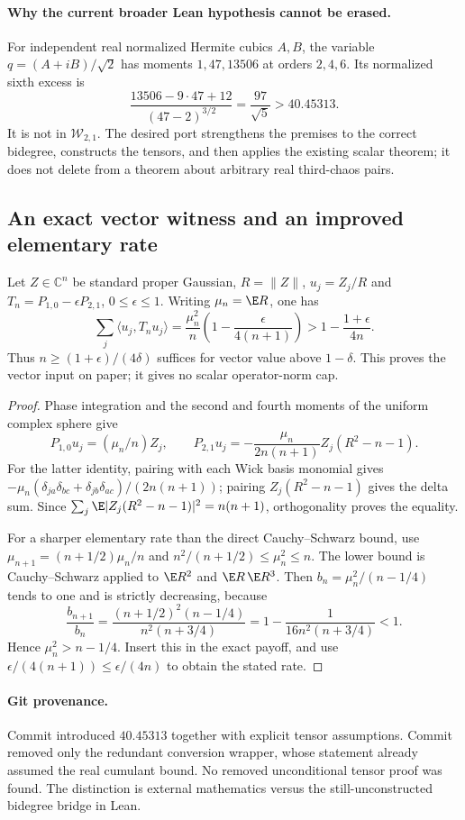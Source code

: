 \paragraph{Why the current broader Lean hypothesis cannot be erased.}
For independent real normalized Hermite cubics $A,B$, the variable
$q=(A+iB)/\sqrt2$ has moments $1,47,13506$ at orders $2,4,6$.
Its normalized sixth excess is
\[
 \frac{13506-9\cdot47+12}{(47-2)^{3/2}}
       =\frac{97}{\sqrt5}>40.45313.
\]
It is not in $\mathcal W_{2,1}$. The desired port strengthens the
premises to the correct bidegree, constructs the tensors, and then
applies the existing scalar theorem; it does not delete 
from a theorem about arbitrary real third-chaos pairs.

\subsection{An exact vector witness and an improved elementary rate}
\begin{proposition}
\label{prop:exact-vector-transfer-audit}
Let $Z\in\mathbb C^n$ be standard proper Gaussian, $R=\|Z\|$,
$u_j=Z_j/R$ and $T_n=P_{1,0}-\epsilon P_{2,1}$, $0\le\epsilon\le1$.
Writing $\mu_n=\E R$, one has
\[
 \sum_j\langle u_j,T_nu_j\rangle
  =\frac{\mu_n^2}{n}\left(1-\frac{\epsilon}{4(n+1)}\right)
  >1-\frac{1+\epsilon}{4n}.
\]
Thus $n\ge(1+\epsilon)/(4\delta)$ suffices for vector value above
$1-\delta$. This proves the vector input on paper; it gives no scalar
operator-norm cap.
\end{proposition}
\begin{proof}
Phase integration and the second and fourth moments of the uniform
complex sphere give
\[
 P_{1,0}u_j=(\mu_n/n)Z_j,\qquad
 P_{2,1}u_j=-\frac{\mu_n}{2n(n+1)}Z_j(R^2-n-1).
\]
For the latter identity, pairing with each Wick basis monomial gives
$-\mu_n(\delta_{ja}\delta_{bc}+\delta_{jb}\delta_{ac})/(2n(n+1))$;
pairing $Z_j(R^2-n-1)$ gives the delta sum. Since
$\sum_j\E|Z_j(R^2-n-1)|^2=n(n+1)$, orthogonality proves the equality.

For a sharper elementary rate than the direct Cauchy--Schwarz bound,
use $\mu_{n+1}=(n+1/2)\mu_n/n$ and
$n^2/(n+1/2)\le\mu_n^2\le n$. The lower bound is Cauchy--Schwarz
applied to $\E R^2$ and $\E R\,\E R^3$.
Then $b_n=\mu_n^2/(n-1/4)$ tends to one and is strictly decreasing,
because
\[
 \frac{b_{n+1}}{b_n}
 =\frac{(n+1/2)^2(n-1/4)}{n^2(n+3/4)}
 =1-\frac1{16n^2(n+3/4)}<1.
\]
Hence $\mu_n^2>n-1/4$. Insert this in the exact payoff, and use
$\epsilon/(4(n+1))\le\epsilon/(4n)$ to obtain the stated rate.
\end{proof}

\paragraph{Git provenance.}
Commit  introduced $40.45313$ together with explicit
tensor assumptions. Commit  removed only the redundant
 conversion wrapper, whose statement
already assumed the real cumulant bound. No removed unconditional
tensor proof was found. The distinction is external mathematics versus
the still-unconstructed bidegree bridge in Lean.
